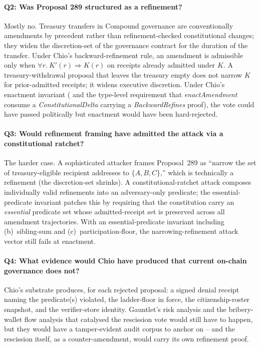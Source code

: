 \paragraph{Q2: Was Proposal 289 structured as a refinement?}
Mostly no. Treasury transfers in Compound governance are conventionally amendments by precedent rather than refinement-checked constitutional changes; they widen the discretion-set of the governance contract for the duration of the transfer. Under Chio's backward-refinement rule, an amendment is admissible only when $\forall r.\ K'(r) \Rightarrow K(r)$ on receipts already admitted under $K$. A treasury-withdrawal proposal that leaves the treasury empty does not narrow $K$ for prior-admitted receipts; it widens executive discretion. Under Chio's enactment invariant ( and the type-level requirement that \emph{enactAmendment} consume a \emph{ConstitutionalDelta} carrying a \emph{BackwardRefines} proof), the vote could have passed politically but enactment would have been hard-rejected.

\paragraph{Q3: Would refinement framing have admitted the attack via a constitutional ratchet?}
The harder case. A sophisticated attacker frames Proposal~289 as ``narrow the set of treasury-eligible recipient addresses to $\{A, B, C\}$,'' which is technically a refinement (the discretion-set shrinks). A constitutional-ratchet attack composes individually valid refinements into an adversary-only predicate; the essential-predicate invariant patches this by requiring that the constitution carry an \emph{essential} predicate set whose admitted-receipt set is preserved across all amendment trajectories. With an essential-predicate invariant including (b)~sibling-sum and (c)~participation-floor, the narrowing-refinement attack vector still fails at enactment.

\paragraph{Q4: What evidence would Chio have produced that current on-chain governance does not?}
Chio's substrate produces, for each rejected proposal: a signed denial receipt naming the predicate(s) violated, the ladder-floor in force, the citizenship-roster snapshot, and the verifier-store identity. Gauntlet's risk analysis and the bribery-wallet flow analysis that catalysed the rescission vote would still have to happen, but they would have a tamper-evident audit corpus to anchor on -- and the rescission itself, as a counter-amendment, would carry its own refinement proof.

